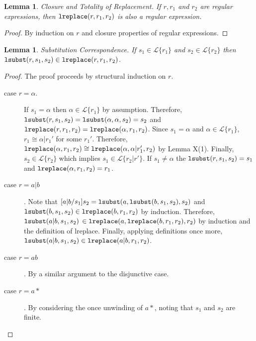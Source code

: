 \documentclass{acm_proc_article-sp}
\newtheorem{lem}[thm]{Lemma}
\theoremstyle{definition}
\newcommand{\Lagr}{\mathcal{L}}
\newcommand{\lang}[1]{\Lagr\{#1\}}
\newcommand{\iso}{\cong}
\newcommand{\lsubst}[3]{{\tt lsubst}(#1,#2,#3)} %
\newcommand{\lreplace}[3]{{\tt lreplace}(#1, #2, #3)}
\begin{document}
\begin{lem}{Closure and Totality of Replacement.} \label{thm:total}
If $r, r_1$ and $r_2$ are regular expressions, then $\lreplace{r}{r_1}{r_2}$ is also a regular expression.
\end{lem}
\begin{proof}
By induction on $r$ and closure properties of regular expressions.
\end{proof}

\begin{lem}{Substitution Correspondence.} \label{thm:substcorrespondence}
If $s_1 \in \lang{r_1}$ and $s_2 \in \lang{r_2}$ then $\lsubst{r}{s_1}{s_2} \in \lreplace{r}{r_1}{r_2}$.
\end{lem}
\begin{proof}
The proof proceeds by structural induction on $r$.

\begin{description}
\item[case $r=\alpha$.]
If $s_1 = \alpha$ then $\alpha \in \lang{r_1}$ by assumption.
Therefore, $\lsubst{r}{s_1}{s_2} = \lsubst{\alpha}{\alpha}{s_2} = s_2$ and
$\lreplace{r}{r_1}{r_2} = \lreplace{\alpha}{r_1}{r_2}$. 
Since $s_1 = \alpha$ and $\alpha \in \lang{r_1}$, $r_1 \iso \alpha | r_1'$ for some $r_1'$.
Therefore, $\lreplace{\alpha}{r_1}{r_2} \iso \lreplace{\alpha}{\alpha|r_1'}{r_2}$ by Lemma X(1).
Finally, $s_2 \in \lang{r_2}$ which implies $s_1 \in \lang{r_2|r'}$.
If $s_1 \not = \alpha$ the $\lsubst{r}{s_1}{s_2} = s_1$ and $\lreplace{\alpha}{r_1}{r_2} = r_1$.

\item[case $r = a|b$].
Note that $\subst{a|b}{s_1}{s_2} = \lsubst{a}{\lsubst{b}{s_1}{s_2}}{s_2}$
and $\lsubst{b}{s_1}{s_2} \in \lreplace{b}{r_1}{r_2}$ by induction.
Therefore, $\lsubst{a|b}{s_1}{s_2}$ $\in \lreplace{a}{\lreplace{b}{r_1}{r_2}}{r_2}$ by induction and the definition of lreplace.
Finally, applying definitions once more, $\lsubst{a|b}{s_1}{s_2} \in \lreplace{a|b}{r_1}{r_2}$.

\item[case $r = ab$].
By a similar argument to the disjunctive case.

\item[case $r = a*$].
By considering the once unwinding of $a*$, noting that $s_1$ and $s_2$ are finite.
\end{description}
\end{proof}
\end{document}
